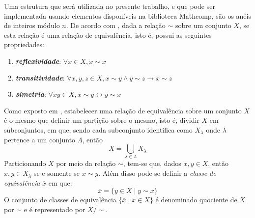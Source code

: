 Uma estrutura que será utilizada no presente trabalho, e que pode ser implementada usando elementos disponíveis na biblioteca Mathcomp, são os anéis de inteiros módulo $n$. De acordo com \cite{book:2399854}, dada a relação $\sim$ sobre um conjunto $X$, se esta relação é uma relação de equivalência, isto é, possui as seguintes propriedades:
\begin{enumerate}
    \item \textbf{\textit{reflexividade}}: $\forall x \in X, x \sim x$
    \item \textbf{\textit{transitividade}}: $\forall x, y, z \in X, x \sim y \land y \sim z \rightarrow x \sim z$
    \item \textbf{\textit{simetria}}: $\forall x y \in X, x \sim y \leftrightarrow y \sim x$
\end{enumerate}
Como exposto em \cite{book:2399854}, estabelecer uma relação de equivalência sobre um conjunto $X$ é o mesmo que definir um partição sobre o mesmo, isto é, dividir $X$ em subconjuntos, em que, sendo cada subconjunto identifica como $X_\lambda$ onde $\lambda$ pertence a um conjunto $\Lambda$, então
\begin{equation*}
    X = \bigcup_{\lambda \in \Lambda} X_{\lambda}
\end{equation*}
Particionando $X$ por meio da relação $\sim$, tem-se que, dados $x, y \in X$, então $x, y \in X_\lambda$ se e somente se $x \sim y$. Além disso pode-se definir a \textit{classe de equivalência} $\overline{x}$ em que:
\begin{equation*}
    \overline{x} = \{y \in X \mid y \sim x \}
\end{equation*}
O conjunto de classes de equivalência $\{\overline{x} \mid x \in X\}$ é denominado quociente de $X$ por $\sim$ e é representado por $X/\sim$.


